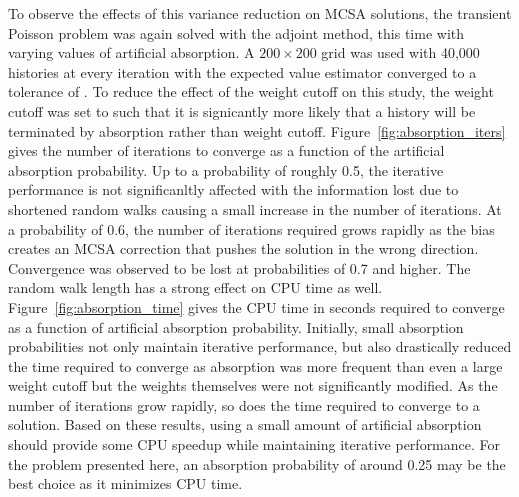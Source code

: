 To observe the effects of this variance reduction on MCSA solutions,
the transient Poisson problem was again solved with the adjoint
method, this time with varying values of artificial absorption. A $200
\times 200$ grid was used with 40,000 histories at every iteration
with the expected value estimator converged to a tolerance of
. To reduce the effect of the weight cutoff on this study,
the weight cutoff was set to  such that it is signicantly
more likely that a history will be terminated by absorption rather
than weight cutoff. Figure~\ref{fig:absorption_iters} gives the number
of iterations to converge as a function of the artificial absorption
probability. Up to a probability of roughly 0.5, the iterative
performance is not significanltly affected with the information lost
due to shortened random walks causing a small increase in the number
of iterations. At a probability of 0.6, the number of iterations
required grows rapidly as the bias creates an MCSA correction that
pushes the solution in the wrong direction. Convergence was observed
to be lost at probabilities of 0.7 and higher. The random walk length
has a strong effect on CPU time as
well. Figure~\ref{fig:absorption_time} gives the CPU time in seconds
required to converge as a function of artificial absorption
probability. Initially, small absorption probabilities not only
maintain iterative performance, but also drastically reduced the time
required to converge as absorption was more frequent than even a large
weight cutoff but the weights themselves were not significantly
modified. As the number of iterations grow rapidly, so does the time
required to converge to a solution. Based on these results, using a
small amount of artificial absorption should provide some CPU speedup
while maintaining iterative performance. For the problem presented
here, an absorption probability of around 0.25 may be the best choice
as it minimizes CPU time.

